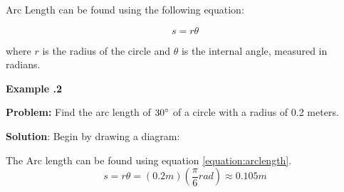   
   	

   
   
   
   
   
   
   
   
   
    Arc Length can be found using the following equation:
   
   	\begin{mdframed}[backgroundcolor=orange!20!white]
   	
   	\begin{equation}
   		s = r \theta
   		\label{equation:arclength}
   	\end{equation}
   \end{mdframed}
where $r$ is the radius of the circle and $\theta$ is the internal angle, measured in radians.






  \begin{mdframed}[backgroundcolor=blue!10!white]
	\begin{center}	
		\textbf{Example \thesection.2}	
	\end{center}
	
	\textbf{Problem:} Find the arc length of $30\degree$ of a circle with a radius of 0.2 meters.  
	 
	
	\vspace{0.2 in} 
	\textbf{Solution}: Begin by drawing a diagram:
	
	
	 	  \begin{center}
	\end{center}
	The Arc length can be found using equation \ref{equation:arclength}.
	\begin{equation*}
		s = r \theta = (0.2 \si{m})(\frac{\pi}{6} \si{rad}) \approx 0.105 \si{m}
	\end{equation*}
	
	
\end{mdframed}
  